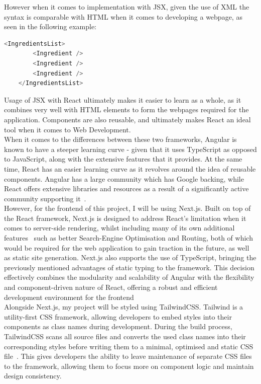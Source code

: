 \documentclass[]{final_report}
\begin{document}
However when it comes to implementation with JSX, given the use of XML the syntax is comparable with HTML when it comes to developing a webpage, as seen in the following example:

\begin{lstlisting}[language=javascript, caption={An example of a React element being defined with JSX (IngredientsList and Ingredient are external functions)\cite{BANKS_REACT}}]
	<IngredientsList>
		<Ingredient />
		<Ingredient />
		<Ingredient />
	</IngredientsList>
\end{lstlisting}

Usage of JSX with React ultimately makes it easier to learn as a whole, as it combines very well with HTML elements to form the webpages required for the application. Components are also reusable, and ultimately makes React an ideal tool when it comes to Web Development.\\

When it comes to the differences between these two frameworks, Angular is known to have a steeper learning curve - given that it uses TypeScript as opposed to JavaScript, along with the extensive features that it provides. At the same time, React has an easier learning curve as it revolves around the idea of reusable components. Angular has a large community which has Google backing, while React offers extensive libraries and resources as a result of a significantly active community supporting it~\cite{FRAMEWORKS_COMPARE}.\\ 

However, for the frontend of this project, I will be using Next.js. Built on top of the React framework, Next.js is designed to address React's limitation when it comes to server-side rendering, whilst including many of its own additional features~\cite{DB_NEXTJS} such as better Search-Engine Optimisation and Routing, both of which would be required for the web application to gain traction in the future, as well as static site generation. Next.js also supports the use of TypeScript, bringing the previously mentioned advantages of static typing to the framework. This decision effectively combines the modularity and scalability of Angular with the flexibility and component-driven nature of React, offering a robust and efficient development environment for the frontend\\

Alongside Next.js, my project will be styled using TailwindCSS. Tailwind is a utility-first CSS framework, allowing developers to embed styles into their components as class names during development. During the build process, TailwindCSS scans all source files and converts the used class names into their corresponding styles before writing them to a minimal, optimised and static CSS file~\cite{TAILWIND}. This gives developers the ability to leave maintenance of separate CSS files to the framework, allowing them to focus more on component logic and maintain design consistency.
\end{document}
